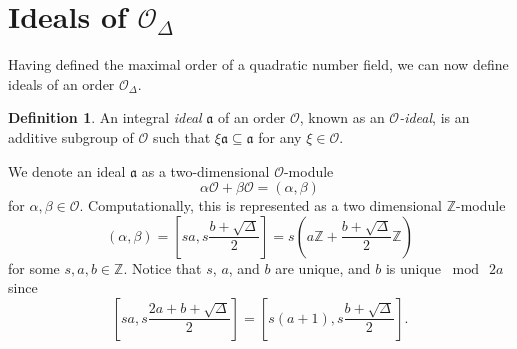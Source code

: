 \documentclass{ucalgthes1}
\theoremstyle{plain}
\theoremstyle{definition}
\newtheorem{defn}[thm]{Definition}
\newcommand{\OO}{\mathcal{O}}
\newcommand{\ZZ}{\mathbb{Z}}
\begin{document}
\bigbreak
\section{Ideals of $\OO_\Delta$}

Having defined the maximal order of a quadratic number field, we can now define ideals of an order $\OO_\Delta$.

\begin{defn}
An integral \emph{ideal} $\mathfrak{a}$ of an order $\OO$, known as an \emph{$\OO$-ideal}, is an additive subgroup of $\OO$ such that $\xi \mathfrak{a} \subseteq \mathfrak{a}$ for any $\xi \in \OO$.
\end{defn}

\noindent
We denote an ideal $\mathfrak{a}$ as a two-dimensional $\OO$-module
\[
	\alpha \OO + \beta \OO = (\alpha, \beta)
\]
for $\alpha, \beta \in \OO$.  Computationally, this is represented as a two dimensional $\ZZ$-module
\begin{equation}
\label{eq:idealZModule}
	(\alpha, \beta) = \left[sa, s \frac{b+ \sqrt{\Delta}}{2} \right] = s \left(a \ZZ + \frac{b + \sqrt{\Delta}}{2} \ZZ \right)
\end{equation}
for some $s, a, b \in \ZZ$.  Notice that $s$, $a$, and $b$ are unique, and $b$ is unique $\bmod~2a$ since
\begin{equation*}
	\left[sa, s\frac{2a+b+\sqrt{\Delta}}{2}\right] = \left[s(a+1), s\frac{b+\sqrt{\Delta}}{2}\right].
\end{equation*}
\end{document}
